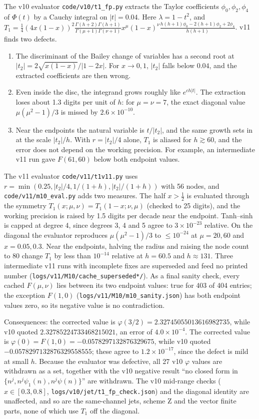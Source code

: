 \documentclass[11pt,a4paper]{article}
\newcommand{\loc}[1]{\nolinkurl{#1}}
\theoremstyle{plain}
\theoremstyle{definition}
\theoremstyle{remark}
\numberwithin{equation}{section}
\begin{document}
The v10 evaluator \loc{code/v10/t1_fp.py} extracts the Taylor
coefficients \(\phi_0,\phi_2,\phi_4\) of \(\Phi(t)\) by a Cauchy
integral on \(|t|=0.04\). Here \(\lambda=1-t^2\), and
\(T_1=\tfrac14(4x(1-x))^2\frac{\Gamma(h+2)\Gamma(h+1)}{\Gamma(\mu+1)\Gamma(\nu+1)}x^\mu(1-x)^\nu
\frac{h(h+1)\phi_0-2(h+1)\phi_2+2\phi_4}{h(h+1)}\). v11 finds two
defects.
\begin{enumerate}[label=(\roman*)]
\item The discriminant of the Bailey change of variables has a second
root at \(|t_2|=2\sqrt{x(1-x)}/|1-2x|\). For \(x\to0,1\), \(|t_2|\)
falls below \(0.04\), and the extracted coefficients are then wrong.
\item Even inside the disc, the integrand grows roughly like
\(e^{c h|t|}\). The extraction loses about 1.3 digits per unit of
\(h\): for \(\mu=\nu=7\), the exact diagonal value
\(\mu(\mu^2-1)/3\) is missed by \(2.6\times10^{-10}\).
\item Near the endpoints the natural variable is \(t/|t_2|\), and the
same growth sets in at the scale \(|t_2|/h\). With
\(r=|t_2|/4\) alone, \(T_1\) is aliased for \(h\gtrsim60\), and the
error does not depend on the working precision. For example, an
intermediate v11 run gave \(F(61,60)\) below both endpoint values.
\end{enumerate}
The v11 evaluator \loc{code/v11/t1v11.py} uses
\(r=\min(0.25,|t_2|/4,1/(1+h),|t_2|/(1+h))\) with 56 nodes, and
\loc{code/v11/m10_eval.py} adds two measures. The half \(x>\tfrac12\)
is evaluated through the symmetry
\(T_1(x;\mu,\nu)=T_1(1-x;\nu,\mu)\) (checked to 25 digits), and the
working precision is raised by 1.5 digits per decade near the
endpoint. Tanh--sinh is capped at degree 4, since degrees 3, 4 and 5
agree to \(3\times10^{-23}\) relative. On the diagonal the evaluator
reproduces \(\mu(\mu^2-1)/3\) to \(\le10^{-24}\) at \(\mu=20,60\)
and \(x=0.05,0.3\). Near the endpoints, halving the radius and
raising the node count to 80 change \(T_1\) by less than
\(10^{-14}\) relative at \(h=60.5\) and \(h\approx131\). Three
intermediate v11 runs with incomplete fixes are superseded and feed
no printed number (\loc{logs/v11/M10/cache_superseded*/}). As a
final sanity check, every cached \(F(\mu,\nu)\) lies between its two
endpoint values: true for 403 of 404 entries; the exception \(F(1,0)\) (\loc{logs/v11/M10/m10_sanity.json}) has both endpoint values zero, so its negative value is no contradiction.

Consequences: the corrected value is \(\varphi(3/2)=2.32745055013616982735\),
while v10 quoted \(2.32785224733468215021\), an error of
\(4.0\times10^{-4}\). The corrected value is
\(\varphi(0)=F(1,0)=-0.0578297132876329675\), while v10 quoted
\(-0.0578297132876329558555\); these agree to \(1.2\times10^{-17}\),
since the defect is mild at small \(h\). Because the evaluator was
defective, all 27 v10 \(\varphi\) values are withdrawn as a set,
together with the
v10 negative result ``no closed form in
\(\{n^j,n^j\psi_1(n),n^j\psi(n)\}\)'' are withdrawn. The v10
mid-range checks (\(x\in[0.3,0.8]\), \loc{logs/v10/jet/t1_fp_check.json})
and the diagonal identity are unaffected, and so are the
same-channel jets, scheme Z and the vector finite parts, none of
which use \(T_1\) off the diagonal.
\end{document}
